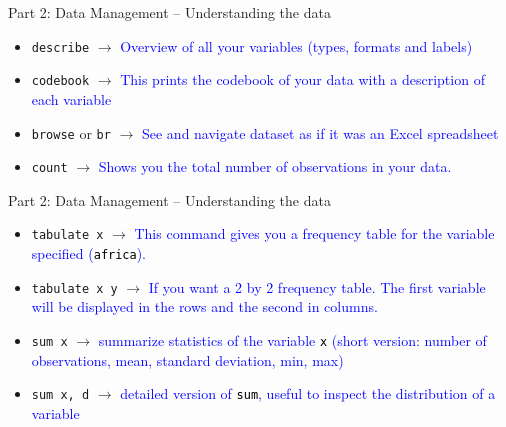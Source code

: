 \documentclass[11pt,notes=hide,aspectratio=169,mathserif]{beamer}
\begin{document}
\begin{frame}{Part 2: Data Management -- Understanding the data}
    \begin{itemize}
        \item \texttt{describe} $\rightarrow$ \textcolor{blue}{Overview of all your variables (types, formats and labels)}
\item \texttt{codebook} $\rightarrow$ \textcolor{blue}{This prints the codebook of your data with a description of each variable}
\item \texttt{browse} or \texttt{br} $\rightarrow$ \textcolor{blue}{See and navigate dataset as if it was an Excel spreadsheet}
\item \texttt{count}   $\rightarrow$ \textcolor{blue}{Shows you the total number of observations in your data.}

    \end{itemize}
\end{frame}

\begin{frame}{Part 2: Data Management -- Understanding the data}
    \begin{itemize}
\item \texttt{tabulate x}   $\rightarrow$ \textcolor{blue}{This command gives you a frequency table for the variable specified (\textcolor{black}{\texttt{africa}}).} 
 \smallskip
\item \texttt{tabulate x y} $\rightarrow$ \textcolor{blue}{If you want a 2 by 2 frequency table. The first variable will be displayed in the rows and the second in columns.} \smallskip
\item \texttt{sum x}   $\rightarrow$ \textcolor{blue}{summarize  statistics of the variable \textcolor{black}{\texttt{x}} (short version: number of observations, mean, standard deviation, min, max)} \smallskip
\item \texttt{sum x, d}   $\rightarrow$ \textcolor{blue}{detailed version of \textcolor{black}{\texttt{sum}}, useful to inspect the distribution of a variable}
\end{itemize}
\end{frame}
\end{document}

